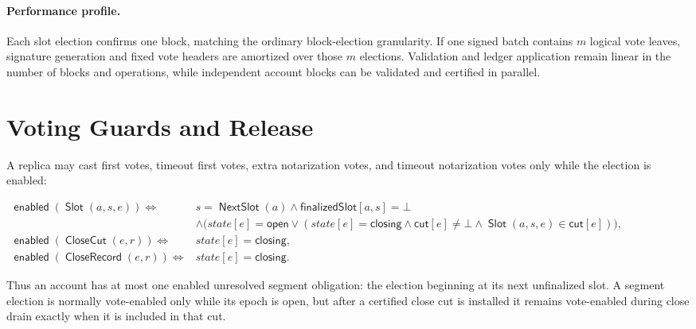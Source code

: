\documentclass[sigplan,twocolumn,review,anonymous]{acmart}
\newcommand{\func}[1]{\operatorname{\mathsf{#1}}}
\newcommand{\Slot}{\func{Slot}}
\newcommand{\NextSlot}{\func{NextSlot}}
\newcommand{\CloseCut}{\func{CloseCut}}
\newcommand{\CloseRecord}{\func{CloseRecord}}
\newcommand{\enabled}{\func{enabled}}
\newcommand{\finalizedSlot}{\mathsf{finalizedSlot}}
\newcommand{\closeCut}{\mathsf{cut}}
\begin{document}
\paragraph{Performance profile.}
Each slot election confirms one block, matching the ordinary block-election granularity.  If one signed
batch contains \(m\) logical vote leaves, signature generation and fixed vote
headers are amortized over those \(m\) elections.  Validation and ledger application remain linear in
the number of blocks and operations, while independent account blocks can be validated and certified
in parallel.

\section{Voting Guards and Release}

A replica may cast first votes, timeout first votes, extra notarization votes, and timeout
notarization votes only while the election is enabled:
\begin{center}
\begin{adjustbox}{max width=\columnwidth}
\(\displaystyle
\begin{aligned}
\enabled(\Slot(a,s,e))\iff{}& s=\NextSlot(a)\wedge\finalizedSlot[a,s]=\bot\\
&\wedge\bigl(state[e]=\mathsf{open}
\vee (state[e]=\mathsf{closing}\wedge\closeCut[e]\neq\bot\wedge\Slot(a,s,e)\in\closeCut[e])\bigr),\\
\enabled(\CloseCut(e,r))\iff{}& state[e]=\mathsf{closing},\\
\enabled(\CloseRecord(e,r))\iff{}& state[e]=\mathsf{closing}.
\end{aligned}
\)
\end{adjustbox}
\end{center}
Thus an account has at most one enabled unresolved segment obligation: the election beginning at its
next unfinalized slot.  A segment election is normally vote-enabled only while its epoch is open, but
after a certified close cut is installed it remains vote-enabled during close drain exactly when it is
included in that cut.
\end{document}
